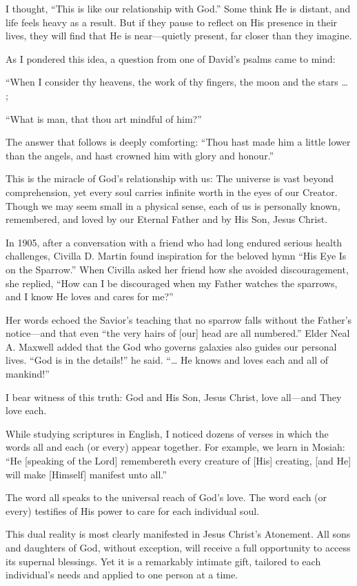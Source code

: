 \documentclass[letterpaper, 11pt]{report}
\begin{document}
I thought, “This is like our relationship with God.” Some think He is distant, and life feels heavy as a result. But if they pause to reflect on His presence in their lives, they will find that He is near—quietly present, far closer than they imagine.

As I pondered this idea, a question from one of David’s psalms came to mind:

“When I consider thy heavens, the work of thy fingers, the moon and the stars … ;

“What is man, that thou art mindful of him?”

The answer that follows is deeply comforting: “Thou hast made him a little lower than the angels, and hast crowned him with glory and honour.”

This is the miracle of God’s relationship with us: The universe is vast beyond comprehension, yet every soul carries infinite worth in the eyes of our Creator. Though we may seem small in a physical sense, each of us is personally known, remembered, and loved by our Eternal Father and by His Son, Jesus Christ.

In 1905, after a conversation with a friend who had long endured serious health challenges, Civilla D. Martin found inspiration for the beloved hymn “His Eye Is on the Sparrow.” When Civilla asked her friend how she avoided discouragement, she replied, “How can I be discouraged when my Father watches the sparrows, and I know He loves and cares for me?”

Her words echoed the Savior’s teaching that no sparrow falls without the Father’s notice—and that even “the very hairs of [our] head are all numbered.” Elder Neal A. Maxwell added that the God who governs galaxies also guides our personal lives. “God is in the details!” he said. “… He knows and loves each and all of mankind!”

I bear witness of this truth: God and His Son, Jesus Christ, love all—and They love each.

While studying scriptures in English, I noticed dozens of verses in which the words all and each (or every) appear together. For example, we learn in Mosiah: “He [speaking of the Lord] remembereth every creature of [His] creating, [and He] will make [Himself] manifest unto all.”

The word all speaks to the universal reach of God’s love. The word each (or every) testifies of His power to care for each individual soul.

This dual reality is most clearly manifested in Jesus Christ’s Atonement. All sons and daughters of God, without exception, will receive a full opportunity to access its supernal blessings. Yet it is a remarkably intimate gift, tailored to each individual’s needs and applied to one person at a time.
\end{document}
